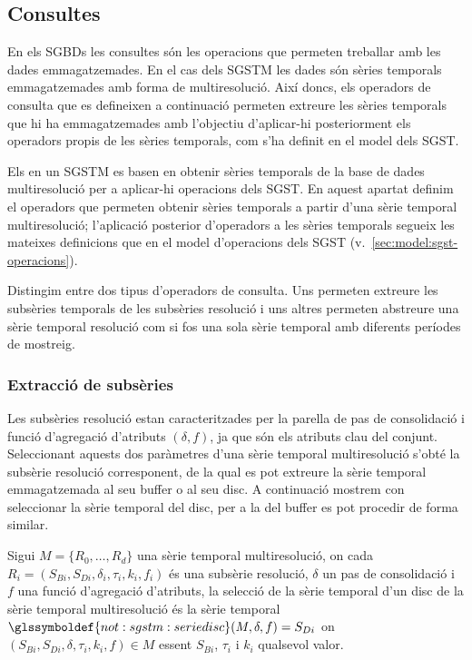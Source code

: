 \subsection{Consultes}
\label{sec:sgstm:consultes}

En els \glspl{SGBD} les consultes són les
operacions que permeten treballar amb les dades emmagatzemades. En el
cas dels \gls{SGSTM} les dades són sèries temporals emmagatzemades amb forma
de multiresolució. Així doncs, els operadors de consulta que es
defineixen a continuació permeten extreure les sèries temporals que hi
ha emmagatzemades amb l'objectiu d’aplicar-hi posteriorment els
operadors propis de les sèries temporals, com s'ha definit en el model
dels \gls{SGST}.

Els  en un
\gls{SGSTM} es basen en obtenir sèries temporals de la base de dades
multiresolució per a aplicar-hi operacions dels \gls{SGST}.  En
aquest apartat definim el operadors que permeten obtenir sèries
temporals a partir d'una sèrie temporal multiresolució; l'aplicació
posterior d'operadors a les sèries temporals segueix les mateixes
definicions que en el model d'operacions dels \gls{SGST}
(v.~\autoref{sec:model:sgst-operacions}).

Distingim entre dos tipus d'operadors de consulta. Uns permeten
extreure les subsèries temporals de les subsèries resolució i uns altres
permeten abstreure una sèrie temporal resolució com si fos una sola
sèrie temporal amb diferents períodes de mostreig.


\subsubsection{Extracció de subsèries}


Les subsèries resolució estan caracteritzades per la parella de pas de
consolidació i funció d'agregació d'atributs $(\delta,f)$, ja que són
els atributs clau del conjunt. Seleccionant aquests dos paràmetres
d'una sèrie temporal multiresolució s'obté la subsèrie resolució
corresponent, de la qual es pot extreure la sèrie temporal
emmagatzemada al seu buffer o al seu disc. A continuació mostrem con
seleccionar la sèrie temporal del disc, per a la del buffer es pot
procedir de forma similar.

\begin{definition}
  Sigui $M=\{R_0,\dotsc,R_{d}\}$ una sèrie temporal multiresolució, on
  cada $R_i=(S_{Bi},S_{Di},\delta_i,\tau_i,k_i,f_i)$ és una subsèrie
  resolució, $\delta$ un pas de consolidació i $f$ una funció
  d'agregació d'atributs, la selecció de la sèrie temporal d'un disc
  de la sèrie temporal multiresolució és la sèrie temporal
  $\glssymboldef{not:sgstm:seriedisc}(M,\delta,f)= S_{Di}$ on
  $(S_{Bi},S_{Di},\delta,\tau_i,k_i,f) \in M$ essent $S_{Bi}$,
  $\tau_i$ i $k_i$ qualsevol valor.
\end{definition}




